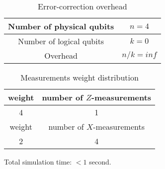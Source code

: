 \documentclass[12pt]{article}
\begin{document}
\newpage
\begin{table}[h]
\centering
\begin{tabular}{c c}
\hline
Number of physical qubits & $n = 4$ \\
\hline
Number of logical qubits & $k = 0$\\
\hline
Overhead & $n/k = inf$\\
\hline
\end{tabular}
\caption{Error-correction overhead}
\end{table}
\vspace{.3cm}


\begin{table}[h]
\centering
\begin{tabular}{c c}
\hline
weight & number of $Z$-measurements\\
\hline
4 & 1\\
\hline
\hline
weight & number of $X$-measurements\\
\hline
2 & 4\\
\hline
\end{tabular}
\caption{Measurements weight distribution}
\end{table}
\vspace{.3cm}



\vspace{2cm}
Total simulation time: $< 1$ second.
\end{document}
